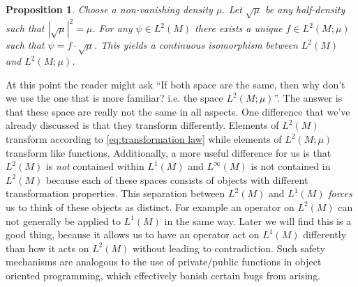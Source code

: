 \documentclass[final,leqno]{siamltex1213}
\newtheorem{prop}[thm]{Proposition}
\DeclareMathOperator{\Dens}{Dens}
\begin{document}
\begin{prop}
	Choose a non-vanishing density $\mu$.
	Let $\sqrt{\mu}$ be any half-density such that $| \sqrt{\mu} |^{2} = \mu$.
	For any $\psi \in L^2(M)$ there exists a unique $f \in L^2(M ; \mu)$ such that $\psi = f \cdot  \sqrt{\mu}$.
	This yields a continuous isomorphism between $L^2(M)$ and $L^2(M ; \mu)$.
\end{prop}
%	

At this point the reader might ask ``If both space are the same, then why don't we use the one that is more familiar?  i.e. the space $L^{2}(M;\mu)$''.
The answer is that these space are really not the same in all aspects.
One difference that we've already discussed is that they transform differently.
Elements of $L^{2}(M)$ transform according to \eqref{eq:transformation law} while elements of $L^{2}(M;\mu)$ transform like functions.
Additionally, a more useful difference for us is that $L^{2}(M)$ is \emph{not} contained within $L^{1}(M)$ and $L^{\infty}(M)$ is not contained in $L^{2}(M)$
because each of these spaces consists of objects with different transformation properties.
This separation between $L^{2}(M)$ and $L^{1}(M)$ \emph{forces} us to think of these objects as distinct.
For example an operator on $L^{2}(M)$ can not generally be applied to $L^{1}(M)$ in the same way.
Later we will find this is a good thing, because it allows us to have an operator act on $L^{1}(M)$ differently than how it acts on $L^{2}(M)$
without leading to contradiction.
Such safety mechanisms are analogous to the use of private/public functions in object oriented programming, which effectively banish certain bugs from arising.
\end{document}
